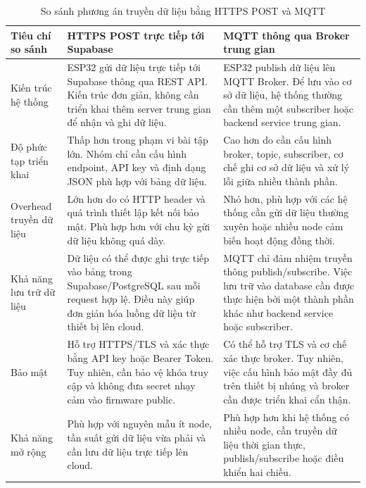 \begin{table}[H]
\centering
\caption{So sánh phương án truyền dữ liệu bằng HTTPS POST và MQTT}
\label{tab:httpvsmqtt}
\footnotesize
\renewcommand{\arraystretch}{1.35}
\setlength{\tabcolsep}{5pt}

\begin{tabularx}{\textwidth}{|p{3.3cm}|X|X|}
\hline
\textbf{Tiêu chí so sánh} 
& \textbf{HTTPS POST trực tiếp tới Supabase} 
& \textbf{MQTT thông qua Broker trung gian} \\
\hline

Kiến trúc hệ thống 
& ESP32 gửi dữ liệu trực tiếp tới Supabase thông qua REST API. Kiến trúc đơn giản, không cần triển khai thêm server trung gian để nhận và ghi dữ liệu. 
& ESP32 publish dữ liệu lên MQTT Broker. Để lưu vào cơ sở dữ liệu, hệ thống thường cần thêm một subscriber hoặc backend service trung gian. \\
\hline

Độ phức tạp triển khai 
& Thấp hơn trong phạm vi bài tập lớn. Nhóm chỉ cần cấu hình endpoint, API key và định dạng JSON phù hợp với bảng dữ liệu. 
& Cao hơn do cần cấu hình broker, topic, subscriber, cơ chế ghi cơ sở dữ liệu và xử lý lỗi giữa nhiều thành phần. \\
\hline

Overhead truyền dữ liệu 
& Lớn hơn do có HTTP header và quá trình thiết lập kết nối bảo mật. Phù hợp hơn với chu kỳ gửi dữ liệu không quá dày. 
& Nhỏ hơn, phù hợp với các hệ thống cần gửi dữ liệu thường xuyên hoặc nhiều node cảm biến hoạt động đồng thời. \\
\hline

Khả năng lưu trữ dữ liệu 
& Dữ liệu có thể được ghi trực tiếp vào bảng trong Supabase/PostgreSQL sau mỗi request hợp lệ. Điều này giúp đơn giản hóa luồng dữ liệu từ thiết bị lên cloud. 
& MQTT chỉ đảm nhiệm truyền thông publish/subscribe. Việc lưu trữ vào database cần được thực hiện bởi một thành phần khác như backend service hoặc subscriber. \\
\hline

Bảo mật 
& Hỗ trợ HTTPS/TLS và xác thực bằng API key hoặc Bearer Token. Tuy nhiên, cần bảo vệ khóa truy cập và không đưa secret nhạy cảm vào firmware public. 
& Có thể hỗ trợ TLS và cơ chế xác thực broker. Tuy nhiên, việc cấu hình bảo mật đầy đủ trên thiết bị nhúng và broker cần được triển khai cẩn thận. \\
\hline

Khả năng mở rộng 
& Phù hợp với nguyên mẫu ít node, tần suất gửi dữ liệu vừa phải và cần lưu dữ liệu trực tiếp lên cloud. 
& Phù hợp hơn khi hệ thống có nhiều node, cần truyền dữ liệu thời gian thực, publish/subscribe hoặc điều khiển hai chiều. \\
\hline


\end{tabularx}
\end{table}
